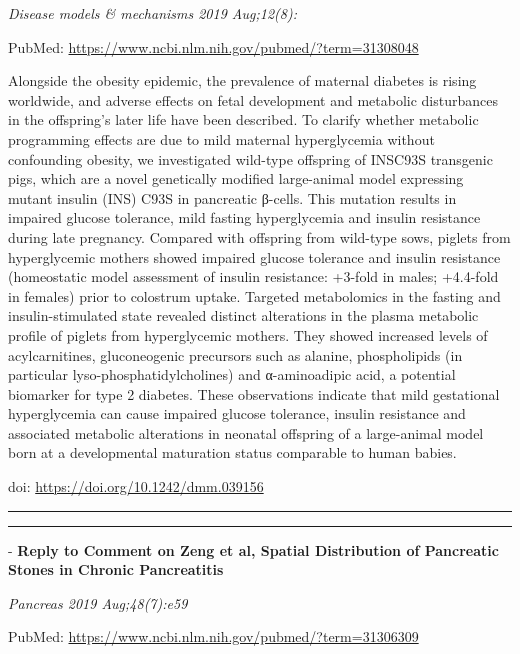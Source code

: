 \documentclass[]{article}
\begin{document}
\emph{Disease models \& mechanisms 2019 Aug;12(8):}

PubMed: \url{https://www.ncbi.nlm.nih.gov/pubmed/?term=31308048}

Alongside the obesity epidemic, the prevalence of maternal diabetes is
rising worldwide, and adverse effects on fetal development and metabolic
disturbances in the offspring's later life have been described. To
clarify whether metabolic programming effects are due to mild maternal
hyperglycemia without confounding obesity, we investigated wild-type
offspring of INSC93S transgenic pigs, which are a novel genetically
modified large-animal model expressing mutant insulin (INS) C93S in
pancreatic β-cells. This mutation results in impaired glucose tolerance,
mild fasting hyperglycemia and insulin resistance during late pregnancy.
Compared with offspring from wild-type sows, piglets from hyperglycemic
mothers showed impaired glucose tolerance and insulin resistance
(homeostatic model assessment of insulin resistance: +3-fold in males;
+4.4-fold in females) prior to colostrum uptake. Targeted metabolomics
in the fasting and insulin-stimulated state revealed distinct
alterations in the plasma metabolic profile of piglets from
hyperglycemic mothers. They showed increased levels of acylcarnitines,
gluconeogenic precursors such as alanine, phospholipids (in particular
lyso-phosphatidylcholines) and α-aminoadipic acid, a potential biomarker
for type 2 diabetes. These observations indicate that mild gestational
hyperglycemia can cause impaired glucose tolerance, insulin resistance
and associated metabolic alterations in neonatal offspring of a
large-animal model born at a developmental maturation status comparable
to human babies.

doi: \url{https://doi.org/10.1242/dmm.039156}

{}

{}

\begin{center}\rule{0.5\linewidth}{\linethickness}\end{center}

\begin{center}\rule{0.5\linewidth}{\linethickness}\end{center}

 - \textbf{Reply to Comment on Zeng et al, Spatial Distribution of
Pancreatic Stones in Chronic Pancreatitis}

\emph{Pancreas 2019 Aug;48(7):e59}

PubMed: \url{https://www.ncbi.nlm.nih.gov/pubmed/?term=31306309}
\end{document}

